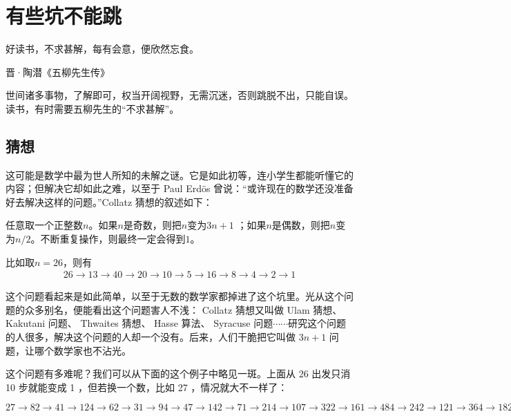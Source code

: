 
\chapter{有些坑不能跳}
\label{chap:traps}

\epigraph{好读书，不求甚解，每有会意，便欣然忘食。}{
  {晋·陶潜《五柳先生传》}
}

世间诸多事物，了解即可，权当开阔视野，无需沉迷，否则跳脱不出，只能自误。读书，有时需要五柳先生的“不求甚解”。

\section{猜想}
\label{sec:guess}

\begin{example}这可能是数学中最为世人所知的未解之谜。它是如此初等，连小学生都能听懂它的内容；但解决它却如此之难，以至于 Paul Erd\"os 曾说：“或许现在的数学还没准备好去解决这样的问题。”Collatz 猜想的叙述如下：

  任意取一个正整数$n$。如果$n$是奇数，则把$n$变为$3n + 1$ ；如果$n$是偶数，则把$n$变为$n/2$。不断重复操作，则最终一定会得到$1$。
\end{example}

比如取$n=26$，则有
\begin{align*}
  26\to 13\to 40\to 20\to 10\to 5\to 16\to 8\to 4\to 2\to 1
\end{align*}

这个问题看起来是如此简单，以至于无数的数学家都掉进了这个坑里。光从这个问题的众多别名，便能看出这个问题害人不浅： Collatz 猜想又叫做 Ulam 猜想、 Kakutani 问题、 Thwaites 猜想、 Hasse 算法、 Syracuse 问题$\cdots\cdots$研究这个问题的人很多，解决这个问题的人却一个没有。后来，人们干脆把它叫做 $3n + 1$ 问题，让哪个数学家也不沾光。

这个问题有多难呢？我们可以从下面的这个例子中略见一斑。上面从 26 出发只消 10 步就能变成 1 ，但若换一个数，比如 27 ，情况就大不一样了：

$
27 \to 82 \to 41 \to 124 \to 62 \to 31 \to 94 \to 47 \to 142 \to 71 \to 214 \to 107 \to 322 \to 161 \to 484 \to 242 \to 121 \to 364 \to 182 \to 91 \to 274 \to 137 \to 412 \to 206 \to 103 \to 310 \to 155 \to 466 \to 233 \to 700 \to 350 \to 175 \to 526 \to 263 \to 790 \to 395 \to 1186 \to 593 \to 1780 \to 890 \to 445 \to 1336 \to 668 \to 334 \to 167 \to 502 \to 251 \to 754 \to 377 \to 1132 \to 566 \to 283 \to 850 \to 425 \to 1276 \to 638 \to 319 \to 958 \to 479 \to 1438 \to 719 \to 2158 \to 1079 \to 3238 \to 1619 \to 4858 \to 2429 \to 7288 \to 3644 \to 1822 \to 911 \to 2734 \to 1367 \to 4102 \to 2051 \to 6154 \to 3077 \to 9232 \to 4616 \to 2308 \to 1154 \to 577 \to 1732 \to 866 \to 433 \to 1300 \to 650 \to 325 \to 976 \to 488 \to 244 \to 122 \to 61 \to 184 \to 92 \to 46 \to 23 \to 70 \to 35 \to 106 \to 53 \to 160 \to 80 \to 40 \to 20 \to 10 \to 5 \to 16 \to 8 \to 4 \to 2 \to 1
$

